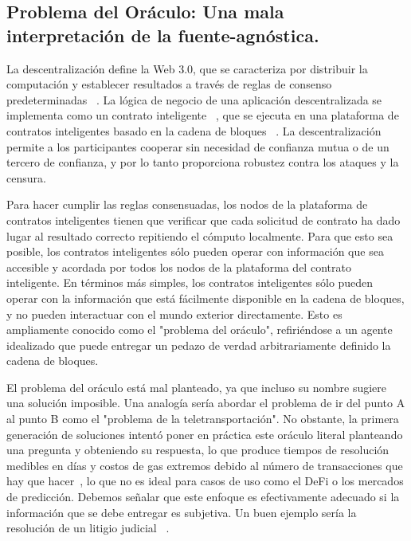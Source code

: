 \documentclass[11pt]{article}
\begin{document}
\subsection{Problema del Oráculo: Una mala interpretación de la fuente-agnóstica.}
\label{sec:oracle-problem-a-misnomer}

La descentralización define la Web 3.0, que se caracteriza por distribuir la computación y establecer resultados a través de reglas de consenso predeterminadas ~\cite{nakamoto:2009}.
La lógica de negocio de una aplicación descentralizada se implementa como un contrato inteligente ~\cite{szabo:1994},
que se ejecuta en una plataforma de contratos inteligentes basado en la cadena de bloques ~\cite{buterin:2014a}.
La descentralización permite a los participantes cooperar sin necesidad de confianza mutua o de un tercero de confianza, y por lo tanto proporciona robustez contra los ataques y la censura.

Para hacer cumplir las reglas consensuadas, los nodos de la plataforma de contratos inteligentes tienen que verificar que cada solicitud de contrato ha dado lugar al resultado correcto repitiendo el cómputo localmente. Para que esto sea posible, los contratos inteligentes sólo pueden operar con información que sea accesible y acordada por todos los nodos de la plataforma del contrato inteligente. En términos más simples, los contratos inteligentes sólo pueden operar con la información que está fácilmente disponible en la cadena de bloques, y no pueden interactuar con el mundo exterior directamente. Esto es ampliamente conocido como el "problema del oráculo", refiriéndose a un agente idealizado que puede entregar un pedazo de verdad arbitrariamente definido la cadena de bloques.

El problema del oráculo está mal planteado, ya que incluso su nombre sugiere una solución imposible. Una analogía sería abordar el problema de ir del punto A al punto B como el "problema de la teletransportación". No obstante, la primera generación de soluciones intentó poner en práctica este oráculo literal planteando una pregunta y obteniendo su respuesta, lo que produce tiempos de resolución medibles en días y costos de gas extremos debido al número de transacciones que hay que hacer~\cite{augur:2019}, lo que no es ideal para casos de uso como el DeFi o los mercados de predicción. Debemos señalar que este enfoque es efectivamente adecuado si la información que se debe entregar es subjetiva. Un buen ejemplo sería la resolución de un litigio judicial ~\cite{kleros:2019}.
\end{document}
